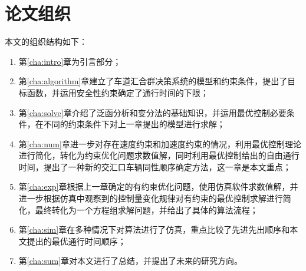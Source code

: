 \section{论文组织}
本文的组织结构如下：
\begin{enumerate}[label=(\arabic*),wide=\parindent]
\item 第\ref{cha:intro}章为引言部分；
\item 第\ref{cha:algorithm}章建立了车道汇合群决策系统的模型和约束条件，提出了目标函数，并运用安全性约束确定了通行时间的下限；
\item 第\ref{cha:solve}章介绍了泛函分析和变分法的基础知识，并运用最优控制必要条件，在不同的约束条件下对上一章提出的模型进行求解；
\item 第\ref{cha:num}章进一步对存在速度约束和加速度约束的情况，利用最优控制理论进行简化，转化为约束优化问题求数值解，同时利用最优控制给出的自由通行时间，提出了一种新的交汇口车辆同性顺序确定方法，这一章是本文重点；
\item 第\ref{cha:exp}章根据上一章确定的有约束优化问题，使用仿真软件求数值解，并进一步根据仿真中观察到的控制量变化规律对有约束的最优控制求解进行简化，最终转化为一个方程组求解问题，并给出了具体的算法流程；
\item 第\ref{cha:sim}章在多种情况下对算法进行了仿真，重点比较了先进先出顺序和本文提出的最优通行时间顺序；
\item 第\ref{cha:sum}章对本文进行了总结，并提出了未来的研究方向。
\end{enumerate}